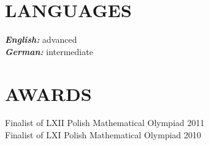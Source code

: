 \documentclass[margin, 10pt]{res} %
\begin{document}
\begin{resume}
\section{ LANGUAGES } 

{\sl \bf English:} advanced \\
{\sl \bf German:} intermediate


\section{ AWARDS } 

Finalist of LXII Polish Mathematical Olympiad \hfill 2011 \\
Finalist of LXI Polish Mathematical Olympiad \hfill 2010





\end{resume}
\end{document}
